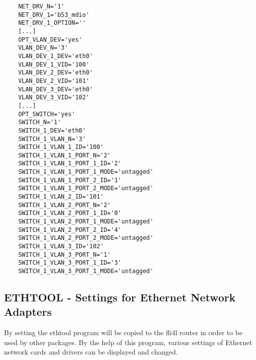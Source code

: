\begin{example}
\begin{verbatim}
    NET_DRV_N='1'
    NET_DRV_1='b53_mdio'
    NET_DRV_1_OPTION=''
    [...]
    OPT_VLAN_DEV='yes'
    VLAN_DEV_N='3'
    VLAN_DEV_1_DEV='eth0'
    VLAN_DEV_1_VID='100'
    VLAN_DEV_2_DEV='eth0'
    VLAN_DEV_2_VID='101'
    VLAN_DEV_3_DEV='eth0'
    VLAN_DEV_3_VID='102'
    [...]
    OPT_SWITCH='yes'
    SWITCH_N='1'
    SWITCH_1_DEV='eth0'
    SWITCH_1_VLAN_N='3'
    SWITCH_1_VLAN_1_ID='100'
    SWITCH_1_VLAN_1_PORT_N='2'
    SWITCH_1_VLAN_1_PORT_1_ID='2'
    SWITCH_1_VLAN_1_PORT_1_MODE='untagged'
    SWITCH_1_VLAN_1_PORT_2_ID='1'
    SWITCH_1_VLAN_1_PORT_2_MODE='untagged'
    SWITCH_1_VLAN_2_ID='101'
    SWITCH_1_VLAN_2_PORT_N='2'
    SWITCH_1_VLAN_2_PORT_1_ID='0'
    SWITCH_1_VLAN_2_PORT_1_MODE='untagged'
    SWITCH_1_VLAN_2_PORT_2_ID='4'
    SWITCH_1_VLAN_2_PORT_2_MODE='untagged'
    SWITCH_1_VLAN_3_ID='102'
    SWITCH_1_VLAN_3_PORT_N='1'
    SWITCH_1_VLAN_3_PORT_1_ID='3'
    SWITCH_1_VLAN_3_PORT_1_MODE='untagged'
\end{verbatim}
\end{example}

\subsection{ETHTOOL - Settings for Ethernet Network Adapters}

By setting  the ethtool program will be copied 
to the fli4l router in order to be used by other packages.
By the help of this program, various settings of Ethernet network 
cards and drivers can be displayed and changed.

